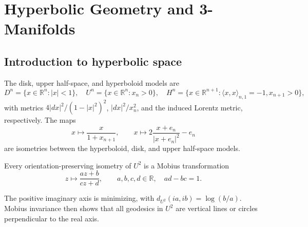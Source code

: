 \chapter[31]{Hyperbolic Geometry and 3-Manifolds}
\label{ch:chow-iv-hyperbolic-geometry-3-manifolds}

\section{Introduction to hyperbolic space}

\begin{definition}
\label{def:chow-iv-hyperbolic-models}

The disk, upper half-space, and hyperboloid models are
\[
 D^n=\{x\in\mathbb R^n:|x|<1\},\quad
 U^n=\{x\in\mathbb R^n:x_n>0\},\quad
 H^n=\{x\in\mathbb R^{n+1}:\langle x,x\rangle_{n,1}=-1, x_{n+1}>0\},
\]
with metrics \(4|dx|^2/(1-|x|^2)^2\), \(|dx|^2/x_n^2\), and the induced
Lorentz metric, respectively.  The maps
\[
 x\mapsto \frac{x}{1+x_{n+1}},\qquad
 x\mapsto 2\frac{x+e_n}{|x+e_n|^2}-e_n
\]
are isometries between the hyperboloid, disk, and upper half-space models.
\end{definition}

\begin{lemma}
\label{lem:chow-iv-hyperbolic-plane-isometries}

Every orientation-preserving isometry of \(U^2\) is a Mobius transformation
\[
 z\longmapsto \frac{az+b}{cz+d},\qquad a,b,c,d\in\mathbb R,\quad ad-bc=1.
\]
\end{lemma}

\begin{example}
\label{ex:chow-iv-hyperbolic-plane-geodesics}

The positive imaginary axis is minimizing, with
\(d_{U^2}(ia,ib)=\log(b/a)\).  Mobius invariance then shows that all
geodesics in \(U^2\) are vertical lines or circles perpendicular to the real
axis.
\end{example}

